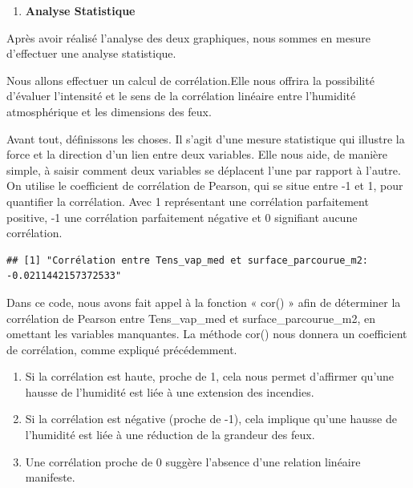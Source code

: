 \documentclass[
]{article}
\newenvironment{Shaded}{\begin{snugshade}}{\end{snugshade}}
\newcommand{\AttributeTok}[1]{\textcolor[rgb]{0.13,0.29,0.53}{#1}}
\newcommand{\FunctionTok}[1]{\textcolor[rgb]{0.13,0.29,0.53}{\textbf{#1}}}
\newcommand{\NormalTok}[1]{#1}
\newcommand{\OtherTok}[1]{\textcolor[rgb]{0.56,0.35,0.01}{#1}}
\newcommand{\SpecialCharTok}[1]{\textcolor[rgb]{0.81,0.36,0.00}{\textbf{#1}}}
\newcommand{\StringTok}[1]{\textcolor[rgb]{0.31,0.60,0.02}{#1}}
\providecommand{\tightlist}{%
  \setlength{\itemsep}{0pt}\setlength{\parskip}{0pt}}
\begin{document}
\begin{enumerate}
\def\labelenumi{\arabic{enumi}.}
\setcounter{enumi}{3}
\tightlist
\item
  \textbf{Analyse Statistique}
\end{enumerate}

Après avoir réalisé l'analyse des deux graphiques, nous sommes en mesure
d'effectuer une analyse statistique.

Nous allons effectuer un calcul de corrélation.Elle nous offrira la
possibilité d'évaluer l'intensité et le sens de la corrélation linéaire
entre l'humidité atmosphérique et les dimensions des feux.

Avant tout, définissons les choses. Il s'agit d'une mesure statistique
qui illustre la force et la direction d'un lien entre deux variables.
Elle nous aide, de manière simple, à saisir comment deux variables se
déplacent l'une par rapport à l'autre. On utilise le coefficient de
corrélation de Pearson, qui se situe entre -1 et 1, pour quantifier la
corrélation. Avec 1 représentant une corrélation parfaitement positive,
-1 une corrélation parfaitement négative et 0 signifiant aucune
corrélation.

\begin{Shaded}
\end{Shaded}

\begin{verbatim}
## [1] "Corrélation entre Tens_vap_med et surface_parcourue_m2:  -0.0211442157372533"
\end{verbatim}

Dans ce code, nous avons fait appel à la fonction « cor() » afin de
déterminer la corrélation de Pearson entre Tens\_vap\_med et
surface\_parcourue\_m2, en omettant les variables manquantes. La méthode
cor() nous donnera un coefficient de corrélation, comme expliqué
précédemment.

\begin{enumerate}
\def\labelenumi{\arabic{enumi}.}
\item
  Si la corrélation est haute, proche de 1, cela nous permet d'affirmer
  qu'une hausse de l'humidité est liée à une extension des incendies.
\item
  Si la corrélation est négative (proche de -1), cela implique qu'une
  hausse de l'humidité est liée à une réduction de la grandeur des feux.
\item
  Une corrélation proche de 0 suggère l'absence d'une relation linéaire
  manifeste.
\end{enumerate}
\end{document}
